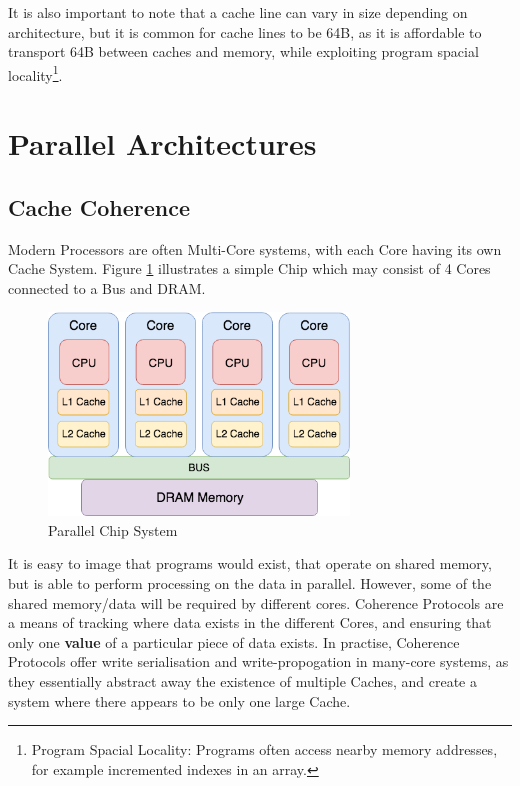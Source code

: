 \documentclass[bsc,frontabs,twoside,singlespacing,parskip,deptreport]{infthesis}     %
\begin{document}
It is also important to note that a cache line can vary in size depending on architecture, but it is common for cache lines to be 64B, as it is affordable to transport 64B between caches and memory, while exploiting program spacial locality\footnote{Program Spacial Locality: Programs often access nearby memory addresses, for example incremented indexes in an array.}.

\newpage

\section{Parallel Architectures}

\subsection{Cache Coherence}
Modern Processors are often Multi-Core systems, with each Core having its own Cache System. Figure \ref{fig:parallel-cpu} illustrates a simple Chip which may consist of 4 Cores connected to a Bus and DRAM.
\begin{figure}[!h]
    \centering
    \includegraphics[width=8cm]{Parallel.png}
    \caption{Parallel Chip System}
    \label{fig:parallel-cpu}
\end{figure}
It is easy to image that programs would exist, that operate on shared memory, but is able to perform processing on the data in parallel. However, some of the shared memory/data will be required by different cores. Coherence Protocols are a means of tracking where data exists in the different Cores, and ensuring that only one \textbf{value} of a particular piece of data exists. In practise, Coherence Protocols offer write serialisation and write-propogation in many-core systems, as they essentially abstract away the existence of multiple Caches, and create a system where there appears to be only one large Cache.
\end{document}

